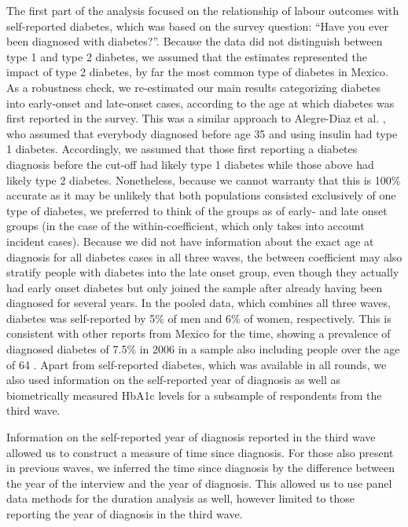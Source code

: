 \documentclass[10pt,letterpaper]{article}
\begin{document}
The first part of the analysis focused on the relationship of labour outcomes with self-reported diabetes, which was based on the survey question: “Have you ever been diagnosed with diabetes?”. Because the data did not distinguish between type 1 and type 2 diabetes, we assumed that the estimates represented the impact of type 2 diabetes, by far the most common type of diabetes in Mexico. As a robustness check, we re-estimated our main results categorizing diabetes into early-onset and late-onset cases, according to the age at which diabetes was first reported in the survey. This was a similar approach to Alegre-Diaz et al. \cite{Alegre-Diaz2016}, who assumed that everybody diagnosed before age 35 and using insulin had type 1 diabetes. Accordingly, we assumed that those first reporting a diabetes diagnosis before the cut-off had likely type 1 diabetes while those above had likely type 2 diabetes. Nonetheless, because we cannot warranty that this is 100\% accurate as it may be unlikely that both populations consisted exclusively of one type of diabetes, we preferred to think of the groups as of early- and late onset groups (in the case of the within-coefficient, which only takes into account incident cases). Because we did not have information about the exact age at diagnosis for all diabetes cases in all three waves, the between coefficient may also stratify people with diabetes into the late onset group, even though they actually had early onset diabetes but only joined the sample after already having been diagnosed for several years. In the pooled data, which combines all three waves, diabetes was self-reported by 5\% of men and 6\% of women, respectively. This is consistent with other reports from Mexico for the time, showing a prevalence of diagnosed diabetes of 7.5\% in 2006 in a sample also including people over the age of 64 \cite{Barquera2013}. Apart from self-reported diabetes, which was available in all rounds, we also used information on the self-reported year of diagnosis as well as biometrically measured \ac{HbA1c} levels for a subsample of respondents from the third wave.


Information on the self-reported year of diagnosis reported in the third wave allowed us to construct a measure of time since diagnosis. For those also present in previous waves, we inferred the time since diagnosis by the difference between the year of the interview and the year of diagnosis. This allowed us to use panel data methods for the duration analysis as well, however limited to those reporting the year of diagnosis in the third wave. 
\end{document}
